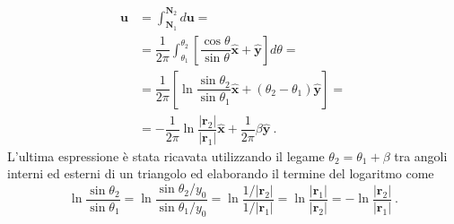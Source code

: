 \begin{equation}
\begin{aligned}
 \bm{u} & = \int_{\bm{N}_1}^{\bm{N}_2} d\bm{u} = \\
 & = \dfrac{1}{2\pi} \int_{\theta_1}^{\theta_2} \left[ \dfrac{\cos \theta}{\sin \theta} \bm{\hat{x}} + \bm{\hat{y}} \right] d \theta  = \\
 & = \dfrac{1}{2\pi} \left[ \ln \dfrac{\sin \theta_2}{\sin \theta_1} \bm{\hat{x}} + (\theta_2 - \theta_1 ) \bm{\hat{y}} \right] = \\
 & = - \dfrac{1}{2\pi} \ln \dfrac{|\bm{r}_2|}{|\bm{r}_1|} \bm{\hat{x}} 
 + \dfrac{1}{2\pi} \beta \bm{\hat{y}} \ .
\end{aligned}
\end{equation}
L'ultima espressione è stata ricavata utilizzando il legame $\theta_2 = \theta_1 + \beta$ tra angoli interni ed esterni di un triangolo ed elaborando il termine del logaritmo come
\begin{equation}
 \ln \dfrac{\sin \theta_2}{\sin \theta_1} =
 \ln \dfrac{\sin \theta_2 / y_0}{\sin \theta_1 / y_0} =
 \ln \dfrac{1 / |\bm{r}_2|}{ 1 / |\bm{r}_1|} =
 \ln \dfrac{ |\bm{r}_1| }{ |\bm{r}_2| } =
 - \ln \dfrac{ |\bm{r}_2| }{ |\bm{r}_1| } \ . 
\end{equation}

\vspace{3.0cm}
\noindent

